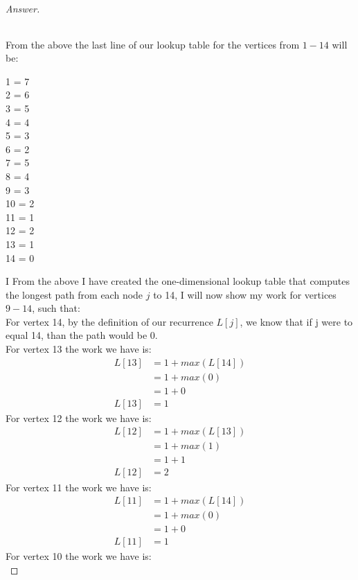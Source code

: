 \documentclass[11pt]{article}
\theoremstyle{definition}
\theoremstyle{definition}
\theoremstyle{definition}
\begin{document}
\begin{proof}[Answer]
\begin{center}
{\begin{tabular}{ | c | c | c | c | c | c | c | c | c | c | c | c | c | c | c |}
    \hline
\end{tabular}
}
\end{center}
From the above the last line of our lookup table for the vertices from $1-14$ will be: \\
\begin{center}
1 = 7 \\
2 = 6 \\
3 = 5 \\
4 = 4 \\
5 = 3 \\
6 = 2 \\
7 = 5 \\
8 = 4 \\
9 = 3 \\
10 = 2 \\
11 = 1 \\
12 = 2 \\
13 = 1 \\
14 = 0 \\
\end{center}
I
From the above I have created the one-dimensional lookup table that computes the longest path from each node $j$ to 14, I will now show my work for vertices $9 - 14$, such that: \\
For vertex 14, by the definition of our recurrence $L[j]$, we know that if j were to equal 14, than the path would be 0. \\
For vertex 13 the work we have is: \\
\begin{align*}
L[13] &= 1 + max(L[14]) \\
&= 1 + max(0) \\
&= 1 + 0 \\
L[13] &= 1
\end{align*}
For vertex 12 the work we have is: \\
\begin{align*}
L[12] &= 1 + max(L[13]) \\
&= 1 + max(1) \\
&= 1 + 1 \\
L[12] &= 2
\end{align*}
For vertex 11 the work we have is: \\
\begin{align*}
L[11] &= 1 + max(L[14]) \\
&= 1 + max(0) \\
&= 1 + 0 \\
L[11] &= 1
\end{align*}
For vertex 10 the work we have is: \\

\end{proof}
\end{document}

